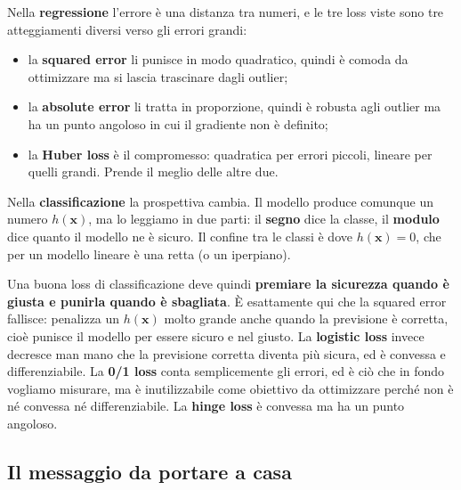 Nella \textbf{regressione} l'errore è una distanza tra numeri, e le tre loss viste sono tre atteggiamenti diversi verso gli errori grandi:
\begin{itemize}
    \item la \textbf{squared error} li punisce in modo quadratico, quindi è comoda da ottimizzare ma si lascia trascinare dagli outlier;
    \item la \textbf{absolute error} li tratta in proporzione, quindi è robusta agli outlier ma ha un punto angoloso in cui il gradiente non è definito;
    \item la \textbf{Huber loss} è il compromesso: quadratica per errori piccoli, lineare per quelli grandi. Prende il meglio delle altre due.
\end{itemize}

Nella \textbf{classificazione} la prospettiva cambia. Il modello produce comunque un numero $h(\mathbf{x})$, ma lo leggiamo in due parti: il \textbf{segno} dice la classe, il \textbf{modulo} dice quanto il modello ne è sicuro. Il confine tra le classi è dove $h(\mathbf{x}) = 0$, che per un modello lineare è una retta (o un iperpiano).

Una buona loss di classificazione deve quindi \textbf{premiare la sicurezza quando è giusta e punirla quando è sbagliata}. È esattamente qui che la squared error fallisce: penalizza un $h(\mathbf{x})$ molto grande anche quando la previsione è corretta, cioè punisce il modello per essere sicuro e nel giusto. La \textbf{logistic loss} invece decresce man mano che la previsione corretta diventa più sicura, ed è convessa e differenziabile. La \textbf{0/1 loss} conta semplicemente gli errori, ed è ciò che in fondo vogliamo misurare, ma è inutilizzabile come obiettivo da ottimizzare perché non è né convessa né differenziabile. La \textbf{hinge loss} è convessa ma ha un punto angoloso.

\subsection*{Il messaggio da portare a casa}
\begin{center}
\end{center}

